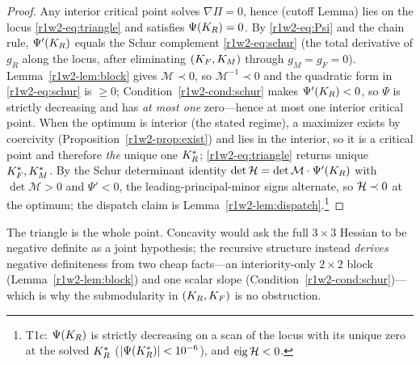 \begin{proof}
Any interior critical point solves $\nabla\Pi=0$, hence (cutoff
Lemma) lies on the locus \eqref{r1w2-eq:triangle} and satisfies $\Psi(K_R)=0$. By
\eqref{r1w2-eq:Psi} and the chain rule, $\Psi'(K_R)$ equals the Schur complement
\eqref{r1w2-eq:schur} (the total derivative of $g_R$ along the locus, after eliminating
$(K_F,K_M)$ through $g_M=g_F=0$). Lemma~\ref{r1w2-lem:block} gives
$\mathcal M\prec0$, so $\mathcal M^{-1}\prec0$ and the quadratic form in
\eqref{r1w2-eq:schur} is $\ge0$; Condition~\ref{r1w2-cond:schur} makes $\Psi'(K_R)<0$, so
$\Psi$ is strictly decreasing and has \emph{at most one} zero---hence at most one
interior critical point. When the optimum is interior (the stated regime), a
maximizer exists by coercivity (Proposition~\ref{r1w2-prop:exist}) and lies in the
interior, so it is a critical point and therefore \emph{the} unique one $K_R^{*}$;
\eqref{r1w2-eq:triangle} returns unique $K_F^{*},K_M^{*}$. By the Schur determinant identity
$\det\mathcal H=\det\mathcal M\cdot\Psi'(K_R)$ with $\det\mathcal M>0$ and $\Psi'<0$,
the leading-principal-minor signs alternate, so $\mathcal H\prec0$ at the optimum; the
dispatch claim is Lemma~\ref{r1w2-lem:dispatch}.\footnote{T1c: $\Psi(K_R)$ is strictly
decreasing on a scan of the locus with its unique zero at the solved $K_R^{*}$
($|\Psi(K_R^{*})|<10^{-6}$), and $\operatorname{eig}\mathcal H<0$.}
\end{proof}

\begin{remark}
The triangle is the whole point. Concavity would ask the full $3\times3$ Hessian
to be negative definite as a joint hypothesis; the recursive structure instead
\emph{derives} negative definiteness from two cheap facts---an interiority-only
$2\times2$ block (Lemma~\ref{r1w2-lem:block}) and one scalar slope
(Condition~\ref{r1w2-cond:schur})---which is why the submodularity in $(K_R,K_F)$ is no
obstruction.
\end{remark}

